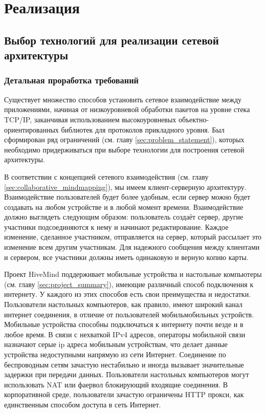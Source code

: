 \newpage

\chapter{Реализация}
\label{ch:chapter_2}

\section{Выбор технологий для реализации сетевой архитектуры}

\subsection{Детальная проработка требований}
Существует множество способов установить сетевое взаимодействие между
приложениями, начиная от низкоуровневой обработки пакетов на уровне стека
TCP/IP, заканчивая использованием высокоуровневых объектно-ориентированных
библиотек для протоколов прикладного уровня. Был сформирован ряд ограничений
(см. главу \ref{sec:problem_statement}), которых необходимо придерживаться при
выборе технологии для построения сетевой архитектуры.

В соответствии с концепцией сетевого взаимодействия (см. главу
\ref{sec:collaborative_mindmapping}), мы имеем клиент-серверную архитектуру.
Взаимодействие пользователей будет более удобным, если сервер можно будет
создавать на любом устройстве и в любой момент времени. Взаимодействие должно
выглядеть следующим образом: пользователь создаёт сервер, другие участники
подсоединяются к нему и начинают редактирование. Каждое изменение, сделанное
участником, отправляется на сервер, который рассылает это изменение всем другим
участникам. Для надежного сообщения между клиентами и сервером, все участники
должны иметь одинаковую и верную копию карты.

Проект HiveMind поддерживает мобильные устройства и настольные компьютеры (см.
главу \ref{sec:project_summary}), имеющие различный способ подключения к
интернету. У каждого из этих способов есть свои преимущества и
недостатки. Пользователи настольных компьютеров, как правило, имеют широкий
канал интернет соединения, в отличие от пользователей мобильмобильных устройств.
Мобильные устройства способны подключаться к интернету почти везде и в любое
время. В связи с нехваткой IPv4 адресов, операторы мобильной связи назначают
серые ip адреса мобильным устройствам, что делает данные устройства недоступными
напрямую из сети Интернет. Соединение по беспроводным сетям зачастую нестабильно
и иногда вызывает значительные задержки при передачи данных. Пользователи
настольных компьютеров могут использовать NAT или фаервол блокирующий
входящие соединения. В корпоративной среде, пользователи зачастую ограничены
HTTP прокси, как единственным способом доступа в сеть Интернет.

